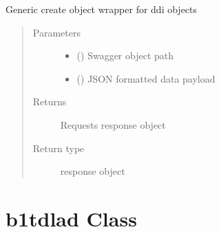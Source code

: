 \documentclass[letterpaper,10pt,english]{sphinxmanual}
\begin{document}
\begin{fulllineitems}
\begin{fulllineitems}
\label{\detokenize{b1tddfp-class:bloxone.b1tddfp.update}}
\sphinxAtStartPar
Generic create object wrapper for ddi objects
\begin{quote}\begin{description}
\item[{Parameters}] \leavevmode\begin{itemize}
\item {} 
\sphinxAtStartPar
{} () \textendash{} Swagger object path

\item {} 
\sphinxAtStartPar
{} () \textendash{} JSON formatted data payload

\end{itemize}

\item[{Returns}] \leavevmode
\sphinxAtStartPar
Requests response object

\item[{Return type}] \leavevmode
\sphinxAtStartPar
response object

\end{description}\end{quote}

\end{fulllineitems}


\end{fulllineitems}



\section{b1tdlad Class}
\label{\detokenize{b1tdlad-class:b1tdlad-class}}\label{\detokenize{b1tdlad-class::doc}}
\end{document}
